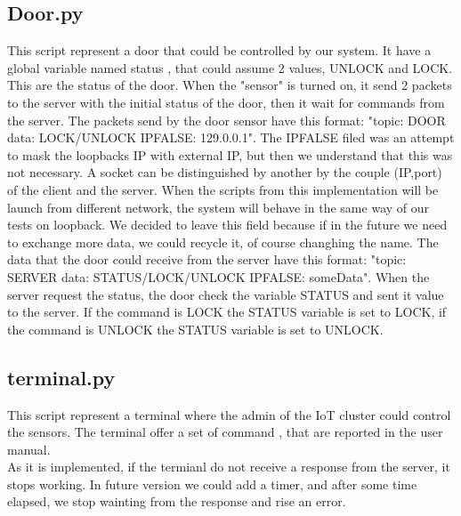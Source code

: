 \subsection{Door.py}
This script represent a door that could be controlled by our system. It have a global variable named status , that could assume 2 values, UNLOCK and LOCK.
This are the status of the door. When the "sensor" is turned on,  it send 2 packets to the server with the initial status of the door, then it wait for commands from the server.  The packets send by the door sensor have this format: "topic: DOOR data: LOCK/UNLOCK IPFALSE: 129.0.0.1". The IPFALSE filed was an attempt
to mask the loopbacks IP with external IP, but then we understand that this was not necessary. A socket can be distinguished by another by the couple (IP,port) 
of the client and the server. When the scripts from this implementation will be launch from different network, the system will behave in the same way of  our tests on loopback. We decided to leave this field because if in the future we need to exchange more data, we could recycle it, of course changhing the name.
The data that the door could receive from the server have this format: "topic: SERVER data: STATUS/LOCK/UNLOCK IPFALSE: someData". When the server 
request the status, the door check the variable STATUS and sent it value to the server.  If the command is LOCK the STATUS variable is set to LOCK, if the command is UNLOCK the STATUS variable is set to UNLOCK.


\subsection{terminal.py}
This script represent a terminal where the admin of the IoT cluster could control the sensors. The terminal offer a set of command , that are reported in the user manual.\\
As it is implemented, if the termianl do not receive a response from the server, it stops working.  In future version we could add a timer, and after some time elapsed, we stop wainting from the response and rise an error.


